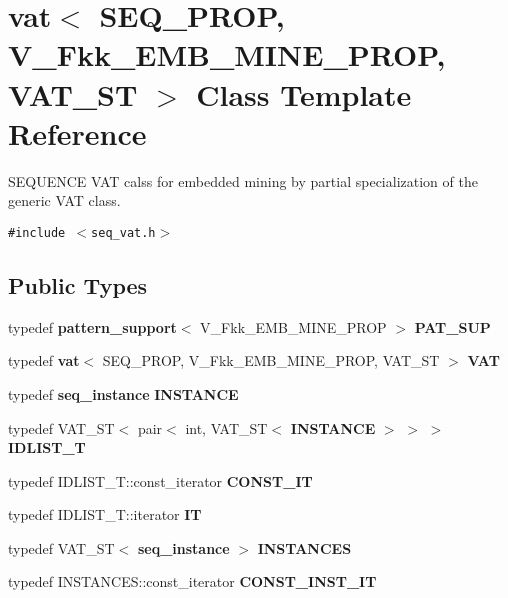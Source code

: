 \section{vat$<$ SEQ\_\-PROP, V\_\-Fkk\_\-EMB\_\-MINE\_\-PROP, VAT\_\-ST $>$ Class Template Reference}
\label{classvat_3_01SEQ__PROP_00_01V__Fkk__EMB__MINE__PROP_00_01VAT__ST_01_4}
SEQUENCE VAT calss for embedded mining by partial specialization of the generic VAT class.  


{\tt \#include $<$seq\_\-vat.h$>$}

\subsection*{Public Types}
\begin{CompactItemize}
\item 
typedef {\bf pattern\_\-support}$<$ V\_\-Fkk\_\-EMB\_\-MINE\_\-PROP $>$ {\bf PAT\_\-SUP}\label{classvat_3_01SEQ__PROP_00_01V__Fkk__EMB__MINE__PROP_00_01VAT__ST_01_4_w0}

\item 
typedef {\bf vat}$<$ SEQ\_\-PROP, V\_\-Fkk\_\-EMB\_\-MINE\_\-PROP, VAT\_\-ST $>$ {\bf VAT}\label{classvat_3_01SEQ__PROP_00_01V__Fkk__EMB__MINE__PROP_00_01VAT__ST_01_4_w1}

\item 
typedef {\bf seq\_\-instance} {\bf INSTANCE}\label{classvat_3_01SEQ__PROP_00_01V__Fkk__EMB__MINE__PROP_00_01VAT__ST_01_4_w2}

\item 
typedef VAT\_\-ST$<$ pair$<$ int, VAT\_\-ST$<$ {\bf INSTANCE} $>$ $>$ $>$ {\bf IDLIST\_\-T}\label{classvat_3_01SEQ__PROP_00_01V__Fkk__EMB__MINE__PROP_00_01VAT__ST_01_4_w3}

\item 
typedef IDLIST\_\-T::const\_\-iterator {\bf CONST\_\-IT}\label{classvat_3_01SEQ__PROP_00_01V__Fkk__EMB__MINE__PROP_00_01VAT__ST_01_4_w4}

\item 
typedef IDLIST\_\-T::iterator {\bf IT}\label{classvat_3_01SEQ__PROP_00_01V__Fkk__EMB__MINE__PROP_00_01VAT__ST_01_4_w5}

\item 
typedef VAT\_\-ST$<$ {\bf seq\_\-instance} $>$ {\bf INSTANCES}\label{classvat_3_01SEQ__PROP_00_01V__Fkk__EMB__MINE__PROP_00_01VAT__ST_01_4_w6}

\item 
typedef INSTANCES::const\_\-iterator {\bf CONST\_\-INST\_\-IT}
\end{CompactItemize}
